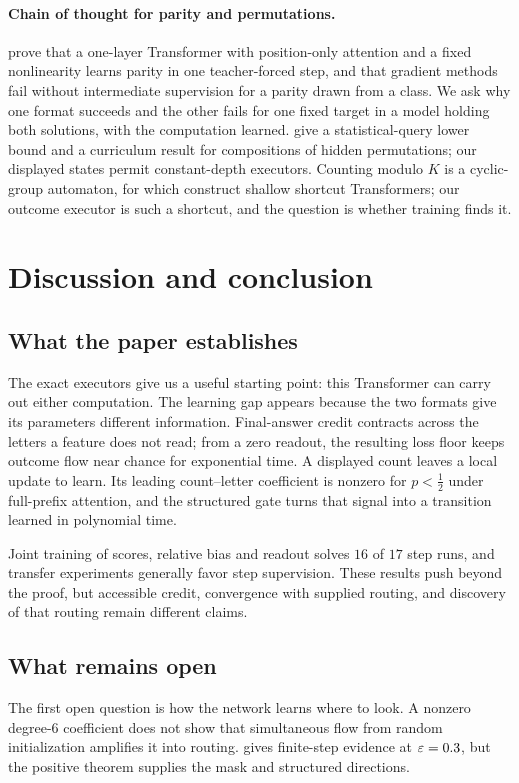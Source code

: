 \paragraph{Chain of thought for parity and permutations.} \citet{kim2024parity} prove that a one-layer Transformer with
position-only attention and a fixed nonlinearity learns parity in one teacher-forced step, and that gradient methods fail
without intermediate supervision for a parity drawn from a class. We ask why one format succeeds and the other fails for
one fixed target in a model holding both solutions, with the computation learned. \citet{wang2025compositional} give a
statistical-query lower bound and a curriculum result for compositions of hidden permutations; our displayed states
permit constant-depth executors. Counting modulo $K$ is a cyclic-group automaton, for which \citet{liu2023automata} construct
shallow shortcut Transformers; our outcome executor is such a shortcut, and the question is whether training finds it.

\section{Discussion and conclusion}
\label{sec:conclusion}
\label{sec:discussion}

\subsection{What the paper establishes}
The exact executors give us a useful starting point: this Transformer can carry out either computation. The learning gap appears
because the two formats give its parameters different information. Final-answer credit contracts across the letters a feature does
not read; from a zero readout, the resulting loss floor keeps outcome flow near chance for exponential time. A displayed count
leaves a local update to learn. Its leading count--letter coefficient is nonzero for $p<\tfrac{1}{2}$ under full-prefix attention,
and the structured gate turns that signal into a transition learned in polynomial time.

Joint training of scores, relative bias and readout solves $16$ of $17$ step runs, and transfer experiments generally favor step
supervision. These results push beyond the proof, but accessible credit, convergence with supplied routing, and discovery of that
routing remain different claims.

\subsection{What remains open}
The first open question is how the network learns where to look. A nonzero degree-$6$ coefficient does not show that simultaneous
flow from random initialization amplifies it into routing.  gives finite-step evidence at $\varepsilon=0.3$, but the
positive theorem supplies the mask and structured directions.

